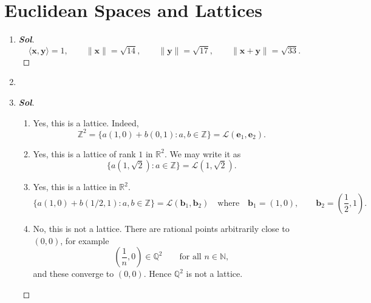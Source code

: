 \section{Euclidean Spaces and Lattices}
\begin{enumerate}
	\item
	\begin{proof}[\normalfont\color{magenta}\bfseries Sol]
		\[
		\boxed{
			\langle \mathbf{x},\mathbf{y}\rangle=1,\qquad
			\|\mathbf{x}\|=\sqrt{14},\qquad
			\|\mathbf{y}\|=\sqrt{17},\qquad
			\|\mathbf{x}+\mathbf{y}\|=\sqrt{33}.
		}
		\]
	\end{proof}
	\item[]
	\item
	\begin{proof}[\normalfont\color{magenta}\bfseries Sol]
		\begin{enumerate}
			\item Yes, this is a lattice. Indeed,
			\[
			\mathbb{Z}^2
			=
			\{a(1,0)+b(0,1):a,b\in\mathbb{Z}\}=\mathcal L(\textbf{e}_1,\textbf{e}_2).
			\]
			
			\item Yes, this is a lattice of rank \(1\) in \(\mathbb{R}^2\). We may write it as
			\[
			\{a(1,\sqrt{2}):a\in\mathbb{Z}\}=\mathcal L(1,\sqrt{2}).
			\]
			
			\item Yes, this is a lattice in \(\mathbb{R}^2\).
			\[
			\{a(1,0)+b(1/2,1): a,b\in\mathbb{Z}\}=\mathcal L(\textbf{b}_1,\textbf{b}_2)\quad\text{where}\quad\mathbf{b}_1=(1,0),\qquad \mathbf{b}_2=\left(\frac12,1\right).
			\]
			
			\item No, this is not a lattice. 
			There are rational points arbitrarily close to \((0,0)\), for example
			\[
			\left(\frac1n,0\right)\in\mathbb{Q}^2
			\qquad\text{for all }n\in\mathbb{N},
			\]
			and these converge to \((0,0)\). Hence \(\mathbb{Q}^2\) is not a lattice.
		\end{enumerate}
		

\end{proof}
\end{enumerate}
